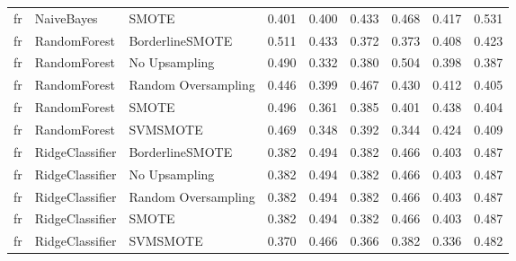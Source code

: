 \begin{tabular}{lllllllll}
      fr &                   NaiveBayes &               SMOTE & 0.401 &                     0.400 &                 0.433 &                  0.468 &                                   0.417 &     0.531 \\
      fr &                 RandomForest &     BorderlineSMOTE & 0.511 &                     0.433 &                 0.372 &                  0.373 &                                   0.408 &     0.423 \\
      fr &                 RandomForest &       No Upsampling & 0.490 &                     0.332 &                 0.380 &                  0.504 &                                   0.398 &     0.387 \\
      fr &                 RandomForest & Random Oversampling & 0.446 &                     0.399 &                 0.467 &                  0.430 &                                   0.412 &     0.405 \\
      fr &                 RandomForest &               SMOTE & 0.496 &                     0.361 &                 0.385 &                  0.401 &                                   0.438 &     0.404 \\
      fr &                 RandomForest &            SVMSMOTE & 0.469 &                     0.348 &                 0.392 &                  0.344 &                                   0.424 &     0.409 \\
      fr &              RidgeClassifier &     BorderlineSMOTE & 0.382 &                     0.494 &                 0.382 &                  0.466 &                                   0.403 &     0.487 \\
      fr &              RidgeClassifier &       No Upsampling & 0.382 &                     0.494 &                 0.382 &                  0.466 &                                   0.403 &     0.487 \\
      fr &              RidgeClassifier & Random Oversampling & 0.382 &                     0.494 &                 0.382 &                  0.466 &                                   0.403 &     0.487 \\
      fr &              RidgeClassifier &               SMOTE & 0.382 &                     0.494 &                 0.382 &                  0.466 &                                   0.403 &     0.487 \\
      fr &              RidgeClassifier &            SVMSMOTE & 0.370 &                     0.466 &                 0.366 &                  0.382 &                                   0.336 &     0.482 \\

\end{tabular}
